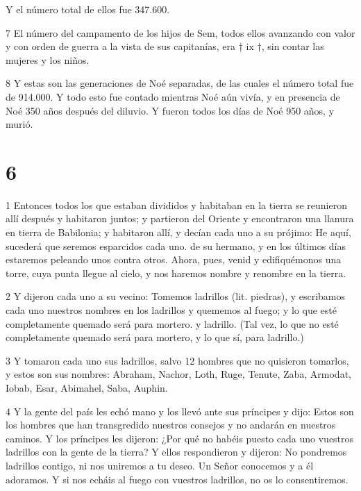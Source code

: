 \par Y el número total de ellos fue 347.600.

\par 7 El número del campamento de los hijos de Sem, todos ellos avanzando con valor y con orden de guerra a la vista de sus capitanías, era † ix †, sin contar las mujeres y los niños.

\par 8 Y estas son las generaciones de Noé separadas, de las cuales el número total fue de 914.000. Y todo esto fue contado mientras Noé aún vivía, y en presencia de Noé 350 años después del diluvio. Y fueron todos los días de Noé 950 años, y murió.

\chapter{6}

\par 1 Entonces todos los que estaban divididos y habitaban en la tierra se reunieron allí después y habitaron juntos; y partieron del Oriente y encontraron una llanura en tierra de Babilonia; y habitaron allí, y decían cada uno a su prójimo: He aquí, sucederá que seremos esparcidos cada uno. de su hermano, y en los últimos días estaremos peleando unos contra otros. Ahora, pues, venid y edifiquémonos una torre, cuya punta llegue al cielo, y nos haremos nombre y renombre en la tierra.

\par 2 Y dijeron cada uno a su vecino: Tomemos ladrillos (lit. piedras), y escribamos cada uno nuestros nombres en los ladrillos y quememos al fuego; y lo que esté completamente quemado será para mortero. y ladrillo. (Tal vez, lo que no esté completamente quemado será para mortero, y lo que sí, para ladrillo.)

\par 3 Y tomaron cada uno sus ladrillos, salvo 12 hombres que no quisieron tomarlos, y estos son sus nombres: Abraham, Nachor, Loth, Ruge, Tenute, Zaba, Armodat, Iobab, Esar, Abimahel, Saba, Auphin.

\par 4 Y la gente del país les echó mano y los llevó ante sus príncipes y dijo: Estos son los hombres que han transgredido nuestros consejos y no andarán en nuestros caminos. Y los príncipes les dijeron: ¿Por qué no habéis puesto cada uno vuestros ladrillos con la gente de la tierra? Y ellos respondieron y dijeron: No pondremos ladrillos contigo, ni nos uniremos a tu deseo. Un Señor conocemos y a él adoramos. Y si nos echáis al fuego con vuestros ladrillos, no os lo consentiremos.

